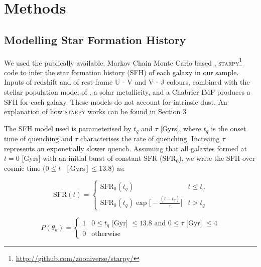 \documentclass[a4paper,fleqn,usenatbib]{mnras}
\begin{document}
\section{Methods}   

   \subsection{Modelling Star Formation History}

   We used the publically available, Markov Chain Monte Carlo based \citep{mackey2013},
   \textsc{starpy}\footnote{\url{http://github.com/zooniverse/starpy/}} code to infer the star formation 
   history (SFH) of each galaxy in our sample. Inputs of redshift and of rest-frame U - V and V - J colours, 
   combined with the stellar population model of \cite{bruzual2003}, a solar metallicity, and a Chabrier IMF 
   \cite{chabrier2003} produces a SFH for each galaxy. These models do not account for intrinsic dust. An 
   explanation of how \textsc{starpy} works can be found in Section 3

   The SFH model used is parameterised by $t_{q}$ and $\tau$ [Gyrs], where $t_{q}$ is the onset time of quenching
   and $\tau$ characterises the rate of quenching. Increaing $\tau$ represents an exponetially slower quench. 
   Assuming that all galaxies formed at $t=0$ [Gyrs] with an initial burst of constant SFR ($\text{SFR}_{0}$), 
   we write the SFH over cosmic time ($0\leq t \text{ }[\text{Gyrs}]\leq 13.8$) as:

 \begin{equation}
       \text{SFR}(t) = \begin{cases}
                 \text{SFR}_{0}(t_{q}) & t \leq t_{q} \\
                 \text{SFR}_{0}(t_{q})\exp\bigg[-\frac{(t-t_{q})}{\tau}\bigg] & t > t_{q} 
                \end{cases}
        \label{eq:model}
 \end{equation}

   

   \begin{equation}
      P(\theta_{k}) = \begin{cases}
                       1 & 0\leq t_{q}\text{ [Gyr] } \leq 13.8 \text{ and }  0 \leq \tau\text{ [Gyr] } \leq 4 \\
                       0 & \text{otherwise}
                      \end{cases}
      \label{eq:prior}
   \end{equation}
\end{document}
